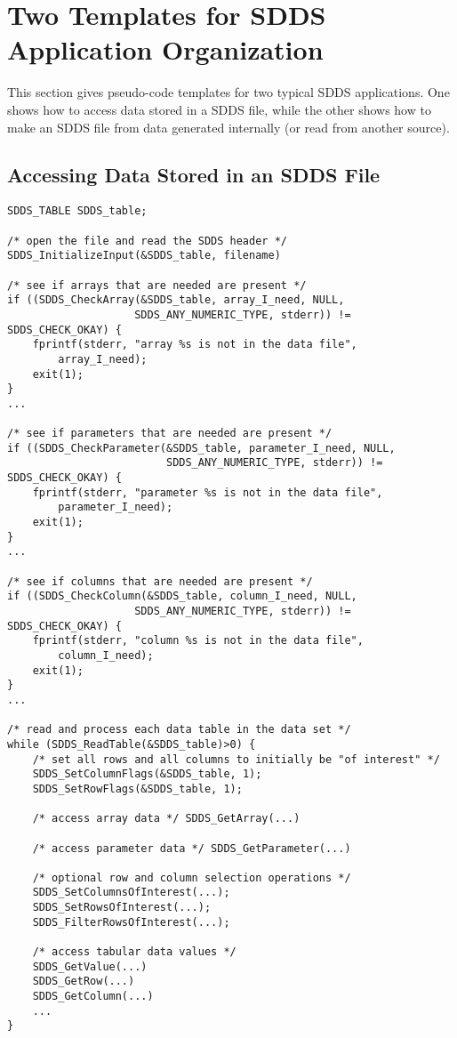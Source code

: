 \documentclass[11pt]{article}
\begin{document}
\section{Two Templates for SDDS Application Organization}
This section gives pseudo-code templates for two typical SDDS applications. One shows how to access data stored in a SDDS file, while the other shows how to make an SDDS file from data generated internally (or read from another source).
\subsection{Accessing Data Stored in an SDDS File}

\begin{verbatim}
SDDS_TABLE SDDS_table;

/* open the file and read the SDDS header */ 
SDDS_InitializeInput(&SDDS_table, filename)

/* see if arrays that are needed are present */
if ((SDDS_CheckArray(&SDDS_table, array_I_need, NULL, 
                    SDDS_ANY_NUMERIC_TYPE, stderr)) != SDDS_CHECK_OKAY) {
    fprintf(stderr, "array %s is not in the data file", 
        array_I_need); 
    exit(1); 
} 
...

/* see if parameters that are needed are present */ 
if ((SDDS_CheckParameter(&SDDS_table, parameter_I_need, NULL, 
                         SDDS_ANY_NUMERIC_TYPE, stderr)) != SDDS_CHECK_OKAY) {
    fprintf(stderr, "parameter %s is not in the data file", 
        parameter_I_need); 
    exit(1); 
} 
...

/* see if columns that are needed are present */ 
if ((SDDS_CheckColumn(&SDDS_table, column_I_need, NULL, 
                    SDDS_ANY_NUMERIC_TYPE, stderr)) != SDDS_CHECK_OKAY) {
    fprintf(stderr, "column %s is not in the data file", 
        column_I_need); 
    exit(1); 
} 
...

/* read and process each data table in the data set */ 
while (SDDS_ReadTable(&SDDS_table)>0) { 
    /* set all rows and all columns to initially be "of interest" */ 
    SDDS_SetColumnFlags(&SDDS_table, 1); 
    SDDS_SetRowFlags(&SDDS_table, 1);

    /* access array data */ SDDS_GetArray(...)

    /* access parameter data */ SDDS_GetParameter(...)

    /* optional row and column selection operations */ 
    SDDS_SetColumnsOfInterest(...); 
    SDDS_SetRowsOfInterest(...); 
    SDDS_FilterRowsOfInterest(...);

    /* access tabular data values */ 
    SDDS_GetValue(...) 
    SDDS_GetRow(...) 
    SDDS_GetColumn(...) 
    ... 
}
\end{verbatim}
\end{document}

